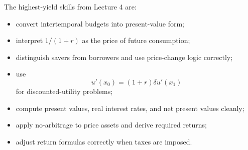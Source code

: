 \begin{examtip}
The highest-yield skills from Lecture 4 are:
\begin{itemize}
    \item convert intertemporal budgets into present-value form;
    \item interpret $1/(1+r)$ as the price of future consumption;
    \item distinguish savers from borrowers and use price-change logic correctly;
    \item use
    \[
    u'(x_0)=(1+r)\delta u'(x_1)
    \]
    for discounted-utility problems;
    \item compute present values, real interest rates, and net present values cleanly;
    \item apply no-arbitrage to price assets and derive required returns;
    \item adjust return formulas correctly when taxes are imposed.
\end{itemize}
\end{examtip}